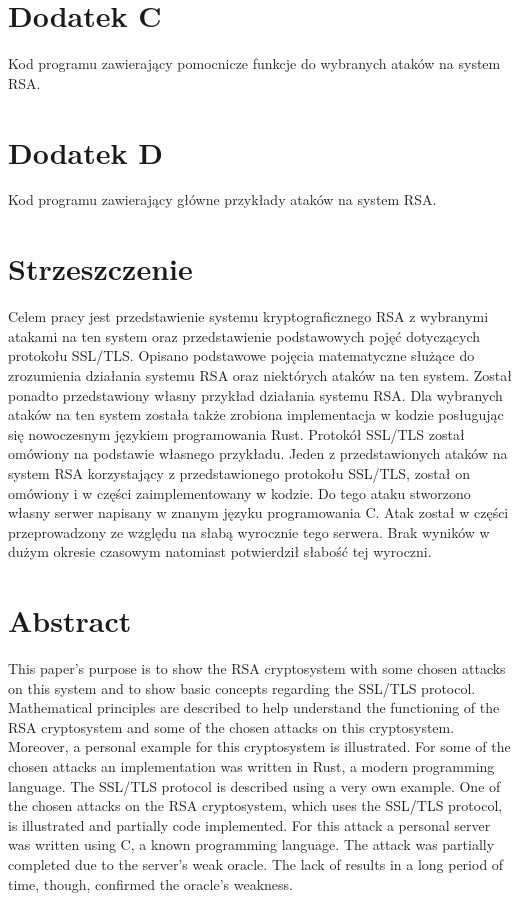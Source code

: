 \documentclass[12pt,twoside,a4]{mwbk}
\theoremstyle{definition}
\begin{document}
\chapter*{Dodatek C}
Kod programu zawierający pomocnicze funkcje do wybranych ataków na system RSA.


\chapter*{Dodatek D}
Kod programu zawierający główne przykłady ataków na system RSA.



\chapter*{Strzeszczenie}
Celem pracy jest przedstawienie systemu kryptograficznego RSA z wybranymi atakami na ten system oraz przedstawienie podstawowych pojęć dotyczących protokołu SSL/TLS. Opisano podstawowe pojęcia matematyczne służące do zrozumienia działania systemu RSA oraz niektórych ataków na ten system. Został ponadto przedstawiony własny przykład działania systemu RSA. Dla wybranych ataków na ten system została także zrobiona implementacja w kodzie posługując się nowoczesnym językiem programowania Rust.
Protokół SSL/TLS został omówiony na podstawie własnego przykładu. Jeden z przedstawionych ataków na system RSA korzystający z przedstawionego protokołu SSL/TLS, został on omówiony i w części zaimplementowany w kodzie. Do tego ataku stworzono własny serwer napisany w znanym języku programowania C. Atak został w części przeprowadzony ze względu na słabą wyrocznie tego serwera. Brak wyników w dużym okresie czasowym natomiast potwierdził słabość tej wyroczni.

\chapter*{Abstract}
This paper's purpose is to show the RSA cryptosystem with some chosen attacks on this system and to show basic concepts regarding the SSL/TLS protocol. Mathematical principles are described to help understand the functioning of the RSA cryptosystem and some of the chosen attacks on this cryptosystem. Moreover, a personal example for this cryptosystem is illustrated. For some of the chosen attacks an implementation was written in Rust, a modern programming language. The SSL/TLS protocol is described using a very own example. One of the chosen attacks on the RSA cryptosystem, which uses the SSL/TLS protocol, is illustrated and partially code implemented. For this attack a personal server was written using C, a known programming language. The attack was partially completed due to the server's weak oracle. The lack of results in a long period of time, though, confirmed the oracle's weakness.
\end{document}
